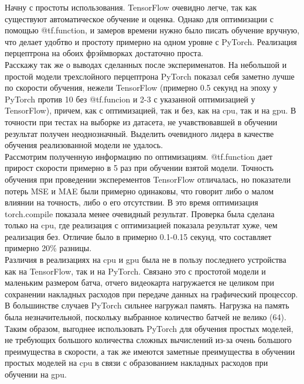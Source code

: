 \documentclass[a4paper,12pt,titlepage,final]{article}
\begin{document}
Начну с простоты использования. TensorFlow очевидно легче, так как существуют автоматическое обучение и оценка. Однако для оптимизации с помощью @tf.function, и замеров времени нужно было писать обучение вручную, что делает удобтво и простоту примерно на одном уровне с PyTorch. Реализация перцептрона на обоих фрэймворках достаточно проста.\\

Расскажу так же о выводах сделанных после эксперименатов. На небольшой и простой модели трехслойного перцептрона PyTorch показал себя заметно лучше по скорости обучения, нежели TensorFlow (примерно 0.5 секунд на эпоху у PyTorch против 10 без @tf.funcion и 2-3 с указанной оптимизацией у TensorFlow), причем, как с оптимизацией, так и без, как на cpu, так и на gpu. В точности при тестах на выборке из датасета, не учавствовавшей в обучении результат получен неоднозначный. Выделить очевидного лидера в качестве обучения реализованной модели не удалось.\\

Рассмотрим полученную информацию по оптимизациям. @tf.function дает прирост скорости примерно в 5 раз при обучении взятой модели. Точность обучения при проведении эксперементов TensorFlow отличалась, но показатели потерь MSE и MAE были примерно одинаковы, что говорит либо о малом влиянии на точность, либо о его отсутствии. В это время оптимизация torch.compile показала менее очевидный результат. Проверка была сделана только на cpu, где реализация с оптимизацией показала результат хуже, чем реализация без. Отличие было в примерно 0.1-0.15 секунд, что составляет примерно 20\% разницы.\\

Различия в реализациях на cpu и gpu была не в пользу последнего устройства как на TensorFlow, так и на PyTorch. Связано это с простотой модели и маленьким размером батча, отчего видеокарта нагружается не целиком при сохранении накладных расходов при передаче данных на графический процессор.\\

В большинстве случаев PyTorch сильнее нагружал память. Нагрузка на память была незначительной, поскольку выбранное количество батчей не велико (64).\\

Таким образом, выгоднее использовать PyTorch для обучения простых моделей, не требующих большого количества сложных вычислений из-за очень большого преимущества в скорости, а так же имеются заметные преимущества в обучении простых моделей на cpu в связи с образованием накладных расходов при обучении на gpu.\\
\end{document}
